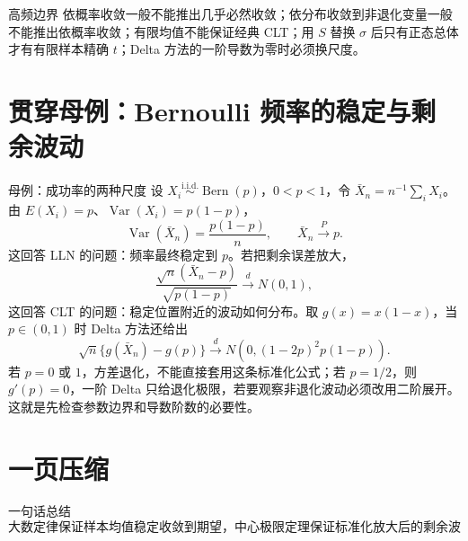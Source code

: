 \documentclass[11pt,a4paper]{ctexart}
\begin{document}
\begin{warnbox}{高频边界}
依概率收敛一般不能推出几乎必然收敛；依分布收敛到非退化变量一般不能推出依概率收敛；有限均值不能保证经典 CLT；用 $S$ 替换 $\sigma$ 后只有正态总体才有有限样本精确 $t$；Delta 方法的一阶导数为零时必须换尺度。
\end{warnbox}

\section{贯穿母例：Bernoulli 频率的稳定与剩余波动}

\begin{examplebox}{母例：成功率的两种尺度}
设 $X_i\overset{\mathrm{i.i.d.}}\sim\operatorname{Bern}(p)$，$0<p<1$，令 $\bar X_n=n^{-1}\sum_iX_i$。
由 $E(X_i)=p$、$\operatorname{Var}(X_i)=p(1-p)$，
\[
\operatorname{Var}(\bar X_n)=\frac{p(1-p)}n,
\qquad \bar X_n\xrightarrow{P}p.
\]
这回答 LLN 的问题：频率最终稳定到 $p$。若把剩余误差放大，
\[
\frac{\sqrt n(\bar X_n-p)}{\sqrt{p(1-p)}}\xrightarrow{d}N(0,1),
\]
这回答 CLT 的问题：稳定位置附近的波动如何分布。取 $g(x)=x(1-x)$，当 $p\in(0,1)$ 时 Delta 方法还给出
\[
\sqrt n\{g(\bar X_n)-g(p)\}\xrightarrow{d}
N\!\left(0,(1-2p)^2p(1-p)\right).
\]
若 $p=0$ 或 $1$，方差退化，不能直接套用这条标准化公式；若 $p=1/2$，则 $g'(p)=0$，一阶 Delta 只给退化极限，若要观察非退化波动必须改用二阶展开。这就是先检查参数边界和导数阶数的必要性。
\end{examplebox}

\section{一页压缩}

\begin{corebox}{一句话总结}
\[
\boxed{\text{大数定律保证样本均值稳定收敛到期望，中心极限定理保证标准化放大后的剩余波动服从正态。}}
\]
\end{corebox}
\end{document}

